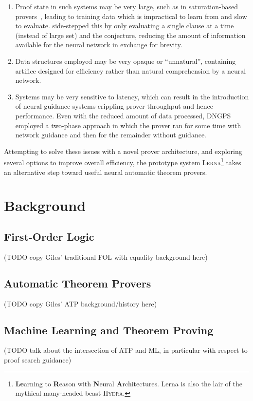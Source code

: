 \documentclass[runningheads]{llncs}
\newcommand{\lerna}{\textsc{Lerna}}
\begin{document}
\begin{enumerate}
	\item Proof state in such systems may be very large, such as in saturation-based provers~\cite{Vampire}, leading to training data which is impractical to learn from and slow to evaluate.  side-stepped this by only evaluating a single clause at a time (instead of large set) and the conjecture, reducing the amount of information available for the neural network in exchange for brevity.
	\item Data structures employed may be very opaque or ``unnatural'', containing artifice designed for efficiency rather than natural comprehension by a neural network.
	\item Systems may be very sensitive to latency, which can result in the introduction of neural guidance systems crippling prover throughput and hence performance. Even with the reduced amount of data processed, DNGPS employed a two-phase approach in which the prover ran for some time with network guidance and then for the remainder without guidance.
\end{enumerate}
%
Attempting to solve these issues with a novel prover architecture, and exploring several options to improve overall efficiency, the prototype system \lerna{}\footnote{\textbf{Le}arning to \textbf{R}eason with \textbf{N}eural \textbf{A}rchitectures. Lerna is also the lair of the mythical many-headed beast \textsc{Hydra}.} takes an alternative step toward useful neural automatic theorem provers.

\section{Background}
\subsection{First-Order Logic}
(TODO copy Giles' traditional FOL-with-equality background here)

\subsection{Automatic Theorem Provers}
(TODO copy Giles' ATP background/history here)

\subsection{Machine Learning and Theorem Proving}
(TODO talk about the intersection of ATP and ML, in particular with respect to proof search guidance)
\end{document}
